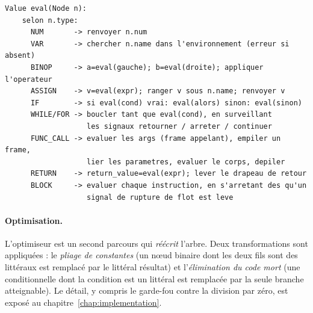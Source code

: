 \begin{lstlisting}[style=c,caption={Principe de l'évaluateur (pseudo-code).},label={lst:eval-pseudo}]
Value eval(Node n):
    selon n.type:
      NUM       -> renvoyer n.num
      VAR       -> chercher n.name dans l'environnement (erreur si absent)
      BINOP     -> a=eval(gauche); b=eval(droite); appliquer l'operateur
      ASSIGN    -> v=eval(expr); ranger v sous n.name; renvoyer v
      IF        -> si eval(cond) vrai: eval(alors) sinon: eval(sinon)
      WHILE/FOR -> boucler tant que eval(cond), en surveillant
                   les signaux retourner / arreter / continuer
      FUNC_CALL -> evaluer les args (frame appelant), empiler un frame,
                   lier les parametres, evaluer le corps, depiler
      RETURN    -> return_value=eval(expr); lever le drapeau de retour
      BLOCK     -> evaluer chaque instruction, en s'arretant des qu'un
                   signal de rupture de flot est leve
\end{lstlisting}

\paragraph{Optimisation.} L'optimiseur est un second parcours qui \emph{réécrit}
l'arbre. Deux transformations sont appliquées : le \emph{pliage de constantes}
(un n\oe ud binaire dont les deux fils sont des littéraux est remplacé par le
littéral résultat) et l'\emph{élimination du code mort} (une conditionnelle dont
la condition est un littéral est remplacée par la seule branche atteignable). Le
détail, y compris le garde-fou contre la division par zéro, est exposé au
chapitre~\ref{chap:implementation}.
